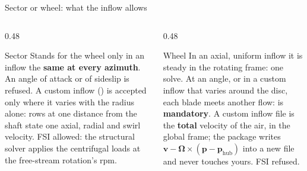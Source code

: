 \begin{frame}{Sector or wheel: what the inflow allows}
\begin{columns}[T]
\begin{column}{0.48\textwidth}
\begin{block}{Sector}
\small Stands for the wheel only in an inflow the \textbf{same at every
azimuth}. An angle of attack or of sideslip is refused. A custom inflow
() is accepted only where it varies with the radius alone:
rows at one distance from the shaft state one axial, radial and swirl
velocity. FSI allowed: the structural solver applies the centrifugal loads at
the free-stream rotation's rpm.
\end{block}
\end{column}
\begin{column}{0.48\textwidth}
\begin{block}{Wheel}
\small In an axial, uniform inflow it is steady in the rotating frame: one
solve. At an angle, or in a custom inflow that varies around the disc, each
blade meets another flow:  is \textbf{mandatory}.
A custom inflow file is the \textbf{total} velocity of the air, in the global
frame; the package writes \(\mathbf{v} - \boldsymbol{\Omega} \times
(\mathbf{p} - \mathbf{p}_\mathrm{hub})\) into a new file and never touches
yours. FSI refused.
\end{block}
\end{column}
\end{columns}
\end{frame}


